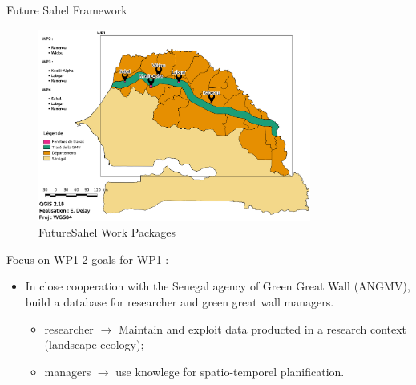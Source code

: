 \documentclass[newPxFont]{beamer}
\begin{document}
\begin{frame}[c]{Future Sahel Framework}
\vspace{-1cm}
\begin{figure}
	\centering
	\includegraphics[width = 0.8\textwidth]{img/Carte_FutureSahel}
	\caption{FutureSahel Work Packages}
\end{figure}
\end{frame}


\begin{frame}[c]{Focus on WP1}
\vspace{-1cm}
2 goals for WP1 :
\begin{itemize}
	\item In close cooperation with the Senegal agency of Green Great Wall (ANGMV), build a database for researcher and green great wall managers.
	\begin{itemize}
		\item researcher $\rightarrow$ Maintain and exploit data producted in a research context (landscape ecology);
		\item managers $\rightarrow$ use knowlege for spatio-temporel planification.
	\end{itemize}
\end{itemize}
\end{frame}

\end{document}
